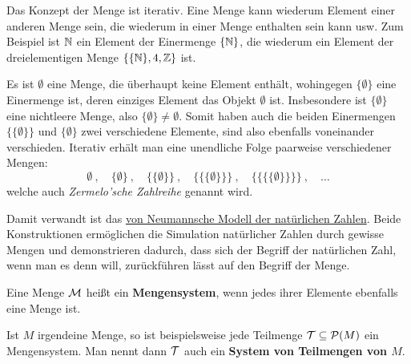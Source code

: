 \begin{vorschau}
    Das Konzept der Menge ist iterativ. Eine Menge kann wiederum Element einer anderen Menge sein, die wiederum in einer Menge enthalten sein kann usw. Zum Beispiel ist $\mathbb N$ ein Element der Einermenge $\{\mathbb N\}$, die wiederum ein Element der dreielementigen Menge $\{ \{\mathbb N \}, 4, \mathbb Z\}$ ist.

    Es ist $\emptyset$ eine Menge, die überhaupt keine Element enthält, wohingegen $\{\emptyset\}$ eine Einermenge ist, deren einziges Element das Objekt $\emptyset$ ist. Insbesondere ist $\{\emptyset\}$ eine nichtleere Menge, also $\{\emptyset\}\neq \emptyset$. Somit haben auch die beiden Einermengen $\{\{\emptyset\}\}$ und $\{\emptyset\}$ zwei verschiedene Elemente, sind also ebenfalls voneinander verschieden. Iterativ erhält man eine unendliche Folge paarweise verschiedener Mengen:
        \[ \emptyset \ ,\quad \{\emptyset\} \ ,\quad \{\{\emptyset\}\} \ ,\quad \{\{\{\emptyset\}\}\} \ , \quad \{\{\{\{\emptyset\}\}\}\} \ ,\quad \dots \]
    welche auch \emph{Zermelo'sche Zahlreihe} genannt wird.

    Damit verwandt ist das \href{https://de.wikipedia.org/wiki/Nat\%C3\%BCrliche_Zahl#Von_Neumanns_Modell_der_nat\%C3\%BCrlichen_Zahlen}{von Neumannsche Modell der natürlichen Zahlen}. Beide Konstruktionen ermöglichen die Simulation natürlicher Zahlen durch gewisse Mengen und demonstrieren dadurch, dass sich der Begriff der natürlichen Zahl, wenn man es denn will, zurückführen lässt auf den Begriff der Menge.
\end{vorschau}


\begin{de}[Mengensystem] 
    Eine Menge $\mathcal M$ heißt ein \textbf{Mengensystem}, wenn jedes ihrer Elemente ebenfalls eine Menge ist.

    Ist $M$ irgendeine Menge, so ist beispielsweise jede Teilmenge $\mathcal T\subseteq \mathcal P(M)$ ein Mengensystem. Man nennt dann $\mathcal T$ auch ein \textbf{System von Teilmengen von $M$}.
\end{de}


